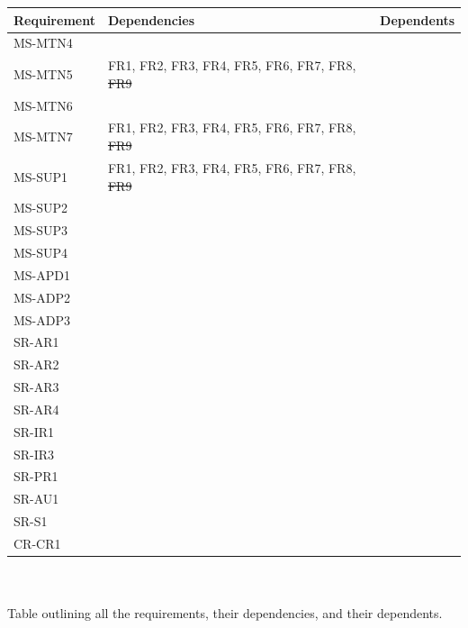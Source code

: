 \documentclass[12pt]{article}
\begin{document}
\begin{tabular}{|p{3cm}|p{3cm}|p{8cm}|}
  \hline
  \textbf{Requirement} & \textbf{Dependencies} & \textbf{Dependents}\\
  \hline
  MS-MTN4& & \\
  MS-MTN5& FR1, FR2, FR3, FR4, FR5, FR6, FR7, FR8, \sout{FR9}& \\
  MS-MTN6& & \\
  MS-MTN7& FR1, FR2, FR3, FR4, FR5, FR6, FR7, FR8, \sout{FR9}& \\
  MS-SUP1& FR1, FR2, FR3, FR4, FR5, FR6, FR7, FR8, \sout{FR9}& \\
  MS-SUP2& & \\
  MS-SUP3& & \\
  MS-SUP4& & \\
  MS-APD1& & \\
  MS-ADP2& & \\
  MS-ADP3& & \\
  SR-AR1& & \\
  SR-AR2& & \\
  SR-AR3& & \\
  SR-AR4& & \\
  SR-IR1& & \\
  SR-IR3& & \\
  SR-PR1& & \\
  SR-AU1& & \\
  SR-S1& & \\
  CR-CR1& & \\
  \hline
\end{tabular}
\\
\\
Table outlining all the requirements, their dependencies, and their dependents.
\end{document}
